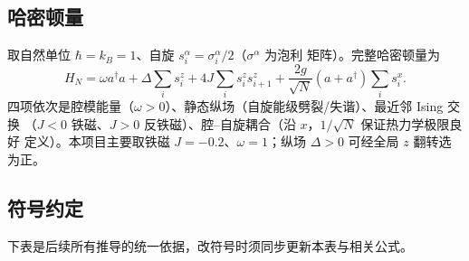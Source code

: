 \documentclass[UTF8,11pt,a4paper]{ctexart}
\begin{document}
\subsection{哈密顿量}

取自然单位 $\hbar=k_B=1$、自旋 $s_i^\alpha=\sigma_i^\alpha/2$（$\sigma^\alpha$ 为泡利
矩阵）。完整哈密顿量为
\begin{equation}
  H_N=\omega a^\dagger a+\Delta\sum_i s_i^z+4J\sum_i s_i^z s_{i+1}^z
  +\frac{2g}{\sqrt N}(a+a^\dagger)\sum_i s_i^x .
  \label{eq:HN}
\end{equation}
四项依次是腔模能量（$\omega>0$）、静态纵场（自旋能级劈裂/失谐）、最近邻 Ising 交换
（$J<0$ 铁磁、$J>0$ 反铁磁）、腔--自旋耦合（沿 $x$，$1/\sqrt N$ 保证热力学极限良好
定义）。本项目主要取铁磁 $J=-0.2$、$\omega=1$；纵场 $\Delta>0$ 可经全局 $z$ 翻转选为正。

\subsection{符号约定}

下表是后续所有推导的统一依据，改符号时须同步更新本表与相关公式。
\end{document}
